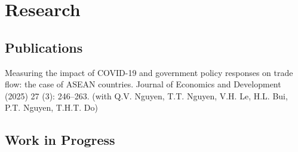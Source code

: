 \documentclass[10.5pt]{article}
\begin{document}

\section{Research}

\subsection{Publications}

\begin{enumerate}[label={[\arabic*]}]

\item Measuring the impact of COVID-19 and government policy responses on trade flow: the case of ASEAN countries. Journal of Economics and Development (2025) 27 (3): 246–263. (with Q.V. Nguyen, T.T. Nguyen, V.H. Le, H.L. Bui, P.T. Nguyen, T.H.T. Do) 


\end{enumerate}

\subsection{Work in Progress}
\end{document}
